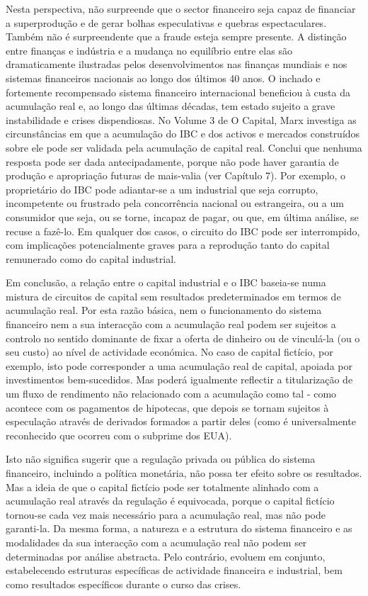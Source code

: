  \par 
Nesta perspectiva, não surpreende que o sector financeiro seja capaz de financiar a superprodução e de gerar bolhas especulativas e quebras espectaculares. Também não é surpreendente que a fraude esteja sempre presente. A distinção entre finanças e indústria e a mudança no equilíbrio entre elas são dramaticamente ilustradas pelos desenvolvimentos nas finanças mundiais e nos sistemas financeiros nacionais ao longo dos últimos {\color{blue}40} anos. O inchado e fortemente recompensado sistema financeiro internacional beneficiou à custa da acumulação real e, ao longo das últimas décadas, tem estado sujeito a grave instabilidade e crises dispendiosas. No Volume {\color{blue}3} de O Capital, Marx investiga as circunstâncias em que a acumulação do IBC e dos activos e mercados construídos sobre ele pode ser validada pela acumulação de capital real. Conclui que nenhuma resposta pode ser dada antecipadamente, porque não pode haver garantia de produção e apropriação futuras de mais-valia (ver Capítulo {\color{blue}7}). Por exemplo, o proprietário do IBC pode adiantar-se a um industrial que seja corrupto, incompetente ou frustrado pela concorrência nacional ou estrangeira, ou a um consumidor que seja, ou se torne, incapaz de pagar, ou que, em última análise, se recuse a fazê-lo. Em qualquer dos casos, o circuito do IBC pode ser interrompido, com implicações potencialmente graves para a reprodução tanto do capital remunerado como do capital industrial.
 \par 
Em conclusão, a relação entre o capital industrial e o IBC baseia-se numa mistura de circuitos de capital sem resultados predeterminados em termos de acumulação real. Por esta razão básica, nem o funcionamento do sistema financeiro nem a sua interacção com a acumulação real podem ser sujeitos a controlo no sentido dominante de fixar a oferta de dinheiro ou de vinculá-la (ou o seu custo) ao nível de actividade económica. No caso de capital fictício, por exemplo, isto pode corresponder a uma acumulação real de capital, apoiada por investimentos bem-sucedidos. Mas poderá igualmente reflectir a titularização de um fluxo de rendimento não relacionado com a acumulação como tal - como acontece com os pagamentos de hipotecas, que depois se tornam sujeitos à especulação através de derivados formados a partir deles (como é universalmente reconhecido que ocorreu com o subprime dos EUA).
 \par 
Isto não significa sugerir que a regulação privada ou pública do sistema financeiro, incluindo a política monetária, não possa ter efeito sobre os resultados. Mas a ideia de que o capital fictício pode ser totalmente alinhado com a acumulação real através da regulação é equivocada, porque o capital fictício tornou-se cada vez mais necessário para a acumulação real, mas não pode garanti-la. Da mesma forma, a natureza e a estrutura do sistema financeiro e as modalidades da sua interacção com a acumulação real não podem ser determinadas por análise abstracta. Pelo contrário, evoluem em conjunto, estabelecendo estruturas específicas de actividade financeira e industrial, bem como resultados específicos durante o curso das crises.
 \par 
